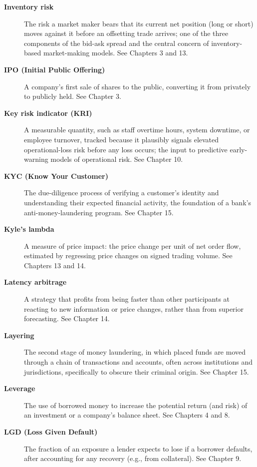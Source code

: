 \documentclass[../ai_in_finance]{subfiles}
\begin{document}
\begin{description}
\item[\textbf{Inventory risk}] The risk a market maker bears that its current net position (long or short) moves against it before an offsetting trade arrives; one of the three components of the bid-ask spread and the central concern of inventory-based market-making models. See Chapters 3 and 13.

\item[\textbf{IPO (Initial Public Offering)}] A company's first sale of shares to the public, converting it from privately to publicly held. See Chapter 3.

\item[\textbf{Key risk indicator (KRI)}] A measurable quantity, such as staff overtime hours, system downtime, or employee turnover, tracked because it plausibly signals elevated operational-loss risk before any loss occurs; the input to predictive early-warning models of operational risk. See Chapter 10.

\item[\textbf{KYC (Know Your Customer)}] The due-diligence process of verifying a customer's identity and understanding their expected financial activity, the foundation of a bank's anti-money-laundering program. See Chapter 15.

\item[\textbf{Kyle's lambda}] A measure of price impact: the price change per unit of net order flow, estimated by regressing price changes on signed trading volume. See Chapters 13 and 14.

\item[\textbf{Latency arbitrage}] A strategy that profits from being faster than other participants at reacting to new information or price changes, rather than from superior forecasting. See Chapter 14.

\item[\textbf{Layering}] The second stage of money laundering, in which placed funds are moved through a chain of transactions and accounts, often across institutions and jurisdictions, specifically to obscure their criminal origin. See Chapter 15.

\item[\textbf{Leverage}] The use of borrowed money to increase the potential return (and risk) of an investment or a company's balance sheet. See Chapters 4 and 8.

\item[\textbf{LGD (Loss Given Default)}] The fraction of an exposure a lender expects to lose if a borrower defaults, after accounting for any recovery (e.g., from collateral). See Chapter 9.


\end{description}
\end{document}
